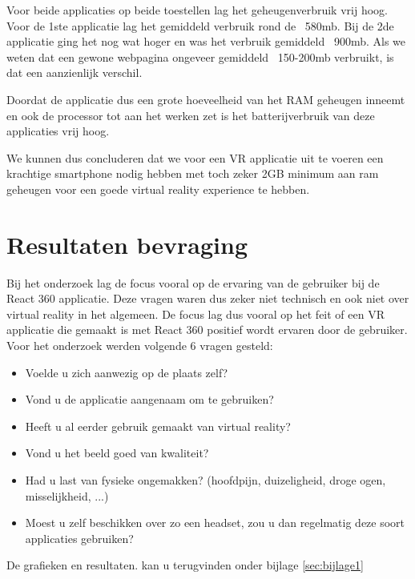 Voor beide applicaties op beide toestellen lag het geheugenverbruik vrij hoog. Voor de 1ste applicatie lag het gemiddeld verbruik rond de ~580mb. Bij de 2de applicatie ging het nog wat hoger en was het verbruik gemiddeld ~900mb.  Als we weten dat een gewone webpagina ongeveer gemiddeld ~150-200mb verbruikt, is dat een aanzienlijk verschil.

Doordat de applicatie dus een grote hoeveelheid van het RAM geheugen inneemt en ook de processor tot aan het werken zet is het batterijverbruik van deze applicaties vrij hoog.

We kunnen dus concluderen dat we voor een VR applicatie uit te voeren een krachtige smartphone nodig hebben met toch zeker 2GB minimum aan ram geheugen voor een goede virtual reality experience te hebben.

\section{Resultaten bevraging}
\label{sec:resulaten-apps}
Bij het onderzoek lag de focus vooral op de ervaring van de gebruiker bij de React 360 applicatie. Deze vragen waren dus zeker niet technisch en ook niet over virtual reality in het algemeen. De focus lag dus vooral op het feit of een VR applicatie die gemaakt is met React 360 positief wordt ervaren door de gebruiker. Voor het onderzoek werden volgende 6 vragen gesteld:

\begin{itemize}
	\item Voelde u zich aanwezig op de plaats zelf?
	\item Vond u de applicatie aangenaam om te gebruiken?
	\item Heeft u al eerder gebruik gemaakt van virtual reality?
	\item Vond u het beeld goed van kwaliteit?
	\item Had u last van fysieke ongemakken? (hoofdpijn, duizeligheid, droge ogen, misselijkheid, ...)
	\item Moest u zelf beschikken over zo een headset, zou u dan regelmatig deze soort applicaties gebruiken? 
\end{itemize}

De grafieken en resultaten. kan u terugvinden onder bijlage \ref{sec:bijlage1}

